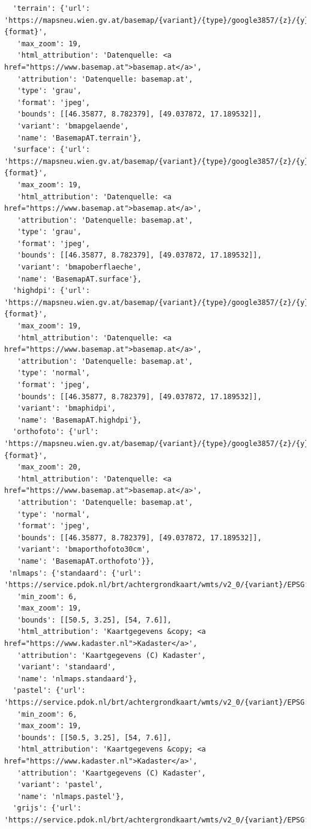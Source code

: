 \documentclass[
  letterpaper,
  DIV=11,
  numbers=noendperiod]{scrreprt}
\begin{document}
\begin{verbatim}
  'terrain': {'url': 'https://mapsneu.wien.gv.at/basemap/{variant}/{type}/google3857/{z}/{y}/{x}.{format}',
   'max_zoom': 19,
   'html_attribution': 'Datenquelle: <a href="https://www.basemap.at">basemap.at</a>',
   'attribution': 'Datenquelle: basemap.at',
   'type': 'grau',
   'format': 'jpeg',
   'bounds': [[46.35877, 8.782379], [49.037872, 17.189532]],
   'variant': 'bmapgelaende',
   'name': 'BasemapAT.terrain'},
  'surface': {'url': 'https://mapsneu.wien.gv.at/basemap/{variant}/{type}/google3857/{z}/{y}/{x}.{format}',
   'max_zoom': 19,
   'html_attribution': 'Datenquelle: <a href="https://www.basemap.at">basemap.at</a>',
   'attribution': 'Datenquelle: basemap.at',
   'type': 'grau',
   'format': 'jpeg',
   'bounds': [[46.35877, 8.782379], [49.037872, 17.189532]],
   'variant': 'bmapoberflaeche',
   'name': 'BasemapAT.surface'},
  'highdpi': {'url': 'https://mapsneu.wien.gv.at/basemap/{variant}/{type}/google3857/{z}/{y}/{x}.{format}',
   'max_zoom': 19,
   'html_attribution': 'Datenquelle: <a href="https://www.basemap.at">basemap.at</a>',
   'attribution': 'Datenquelle: basemap.at',
   'type': 'normal',
   'format': 'jpeg',
   'bounds': [[46.35877, 8.782379], [49.037872, 17.189532]],
   'variant': 'bmaphidpi',
   'name': 'BasemapAT.highdpi'},
  'orthofoto': {'url': 'https://mapsneu.wien.gv.at/basemap/{variant}/{type}/google3857/{z}/{y}/{x}.{format}',
   'max_zoom': 20,
   'html_attribution': 'Datenquelle: <a href="https://www.basemap.at">basemap.at</a>',
   'attribution': 'Datenquelle: basemap.at',
   'type': 'normal',
   'format': 'jpeg',
   'bounds': [[46.35877, 8.782379], [49.037872, 17.189532]],
   'variant': 'bmaporthofoto30cm',
   'name': 'BasemapAT.orthofoto'}},
 'nlmaps': {'standaard': {'url': 'https://service.pdok.nl/brt/achtergrondkaart/wmts/v2_0/{variant}/EPSG:3857/{z}/{x}/{y}.png',
   'min_zoom': 6,
   'max_zoom': 19,
   'bounds': [[50.5, 3.25], [54, 7.6]],
   'html_attribution': 'Kaartgegevens &copy; <a href="https://www.kadaster.nl">Kadaster</a>',
   'attribution': 'Kaartgegevens (C) Kadaster',
   'variant': 'standaard',
   'name': 'nlmaps.standaard'},
  'pastel': {'url': 'https://service.pdok.nl/brt/achtergrondkaart/wmts/v2_0/{variant}/EPSG:3857/{z}/{x}/{y}.png',
   'min_zoom': 6,
   'max_zoom': 19,
   'bounds': [[50.5, 3.25], [54, 7.6]],
   'html_attribution': 'Kaartgegevens &copy; <a href="https://www.kadaster.nl">Kadaster</a>',
   'attribution': 'Kaartgegevens (C) Kadaster',
   'variant': 'pastel',
   'name': 'nlmaps.pastel'},
  'grijs': {'url': 'https://service.pdok.nl/brt/achtergrondkaart/wmts/v2_0/{variant}/EPSG:3857/{z}/{x}/{y}.png',

\end{verbatim}
\end{document}
